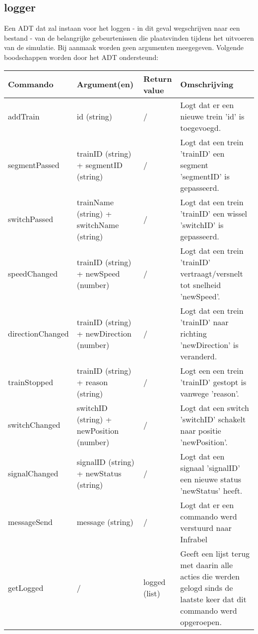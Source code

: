 \documentclass{article}
\begin{document}
\subsection{logger} %
Een ADT dat zal instaan voor het loggen - in dit geval wegschrijven naar een bestand - van de belangrijke gebeurtenissen die plaatsvinden tijdens het uitvoeren van de simulatie. Bij aanmaak worden geen argumenten meegegeven.
Volgende boodschappen worden door het ADT ondersteund:
\begin{center}
    \begin{tabular}{ | l | p{3.5cm} | l | p{8cm} |}
    \hline
    Commando & Argument(en) & Return value & Omschrijving \\ \hline
    addTrain & id (string) & / & Logt dat er een nieuwe trein 'id' is toegevoegd. \\ \hline
    segmentPassed & trainID (string) + segmentID (string) & / & Logt dat een trein 'trainID' een segment 'segmentID' is gepasseerd. \\ \hline
    switchPassed & trainName (string) + switchName (string) & / & Logt dat een trein 'trainID' een wissel 'switchID' is gepasseerd. \\ \hline
    speedChanged & trainID (string) + newSpeed (number) & / & Logt dat een trein 'trainID' vertraagt/versnelt tot snelheid 'newSpeed'. \\ \hline
    directionChanged & trainID (string) + newDirection (number) & / & Logt dat een trein 'trainID' naar richting 'newDirection' is veranderd. \\ \hline
    trainStopped & trainID (string) + reason (string) & / & Logt een een trein 'trainID' gestopt is vanwege 'reason'. \\ \hline
    switchChanged & switchID (string) + newPosition (number) & / & Logt dat een switch 'switchID' schakelt naar positie 'newPosition'. \\ \hline
    signalChanged & signalID (string) + newStatus (string) & / & Logt dat een signaal 'signalID' een nieuwe status 'newStatus' heeft. \\ \hline
    messageSend & message (string) & / & Logt dat er een commando werd verstuurd naar Infrabel \\ \hline
    getLogged & / & logged (list) & Geeft een lijst terug met daarin alle acties die werden gelogd sinds de laatste keer dat dit commando werd opgeroepen. \\ \hline
    \end{tabular}
\end{center}
\end{document}
